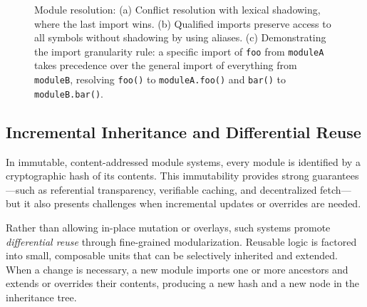 \documentclass[sigplan,screen]{acmart}
\begin{document}
\begin{figure}[t]
\begin{tikzpicture}
\end{tikzpicture}

\vspace{1cm} %

\caption{Module resolution: (a) Conflict resolution with lexical shadowing, where the last import wins. (b) Qualified imports preserve access to all symbols without shadowing by using aliases. (c) Demonstrating the import granularity rule: a specific import of \texttt{foo} from \texttt{moduleA} takes precedence over the general import of everything from \texttt{moduleB}, resolving \texttt{foo()} to \texttt{moduleA.foo()} and \texttt{bar()} to \texttt{moduleB.bar()}.}
\label{fig:module-resolution}
\end{figure}

\subsection{Incremental Inheritance and Differential Reuse}
\label{sec:incremental-inheritance-differential-reuse}

In immutable, content-addressed module systems, every module is identified by a cryptographic hash of its contents. This immutability provides strong guarantees—such as referential transparency, verifiable caching, and decentralized fetch—but it also presents challenges when incremental updates or overrides are needed.

Rather than allowing in-place mutation or overlays, such systems promote \emph{differential reuse} through fine-grained modularization. Reusable logic is factored into small, composable units that can be selectively inherited and extended. When a change is necessary, a new module imports one or more ancestors and extends or overrides their contents, producing a new hash and a new node in the inheritance tree.
\end{document}
